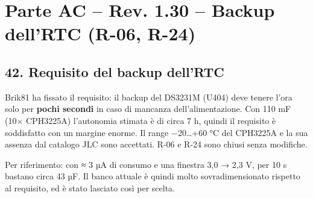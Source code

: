 \clearpage
\section[Parte AC – Rev. 1.30 – Backup dell'RTC (R-06, R-24)]{Parte AC – Rev. 1.30 – Backup dell'RTC (R-06, R-24)}

\subsection[42. Requisito del backup dell'RTC]{42. Requisito del backup dell'RTC}

Brik81 ha fissato il requisito: il backup del DS3231M (U404) deve tenere l'ora solo per \textbf{pochi secondi} in caso di mancanza dell'alimentazione. Con 110 mF (10× CPH3225A) l'autonomia stimata è di circa 7 h, quindi il requisito è soddisfatto con un margine enorme. Il range −20…+60 °C del CPH3225A e la sua assenza dal catalogo JLC sono accettati. R-06 e R-24 sono chiusi senza modifiche.

Per riferimento: con ≈ 3 µA di consumo e una finestra 3,0 → 2,3 V, per 10 s bastano circa 43 µF. Il banco attuale è quindi molto sovradimensionato rispetto al requisito, ed è stato lasciato così per scelta.
